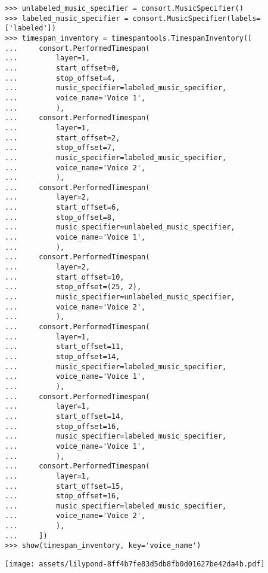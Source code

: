 \begin{singlespacing}
\vspace{-0.5\baselineskip}
\begin{lstlisting}
>>> unlabeled_music_specifier = consort.MusicSpecifier()
>>> labeled_music_specifier = consort.MusicSpecifier(labels=['labeled'])
>>> timespan_inventory = timespantools.TimespanInventory([
...     consort.PerformedTimespan(
...         layer=1,
...         start_offset=0,
...         stop_offset=4,
...         music_specifier=labeled_music_specifier,
...         voice_name='Voice 1',
...         ),
...     consort.PerformedTimespan(
...         layer=1,
...         start_offset=2,
...         stop_offset=7,
...         music_specifier=labeled_music_specifier,
...         voice_name='Voice 2',
...         ),
...     consort.PerformedTimespan(
...         layer=2,
...         start_offset=6,
...         stop_offset=8,
...         music_specifier=unlabeled_music_specifier,
...         voice_name='Voice 1',
...         ),
...     consort.PerformedTimespan(
...         layer=2,
...         start_offset=10,
...         stop_offset=(25, 2),
...         music_specifier=unlabeled_music_specifier,
...         voice_name='Voice 2',
...         ),
...     consort.PerformedTimespan(
...         layer=1,
...         start_offset=11,
...         stop_offset=14,
...         music_specifier=labeled_music_specifier,
...         voice_name='Voice 1',
...         ),
...     consort.PerformedTimespan(
...         layer=1,
...         start_offset=14,
...         stop_offset=16,
...         music_specifier=labeled_music_specifier,
...         voice_name='Voice 1',
...         ),
...     consort.PerformedTimespan(
...         layer=1,
...         start_offset=15,
...         stop_offset=16,
...         music_specifier=labeled_music_specifier,
...         voice_name='Voice 2',
...         ),
...     ])
>>> show(timespan_inventory, key='voice_name')
\end{lstlisting}
\noindent\texttt{[image: assets/lilypond-8ff4b7fe83d5db8fb0d01627be42da4b.pdf]}
\end{singlespacing}

\begin{comment}
<abjad>
dependent_timespan_maker = consort.DependentTimespanMaker(
    include_inner_starts=True,
    voice_names=('Voice 1', 'Voice 2'),
    )
result = dependent_timespan_maker(
    layer=3,
    music_specifiers={'Voice 3': None},
    timespan_inventory=timespan_inventory[:],
    )
show(result, key='voice_name')
</abjad>
\end{comment}

